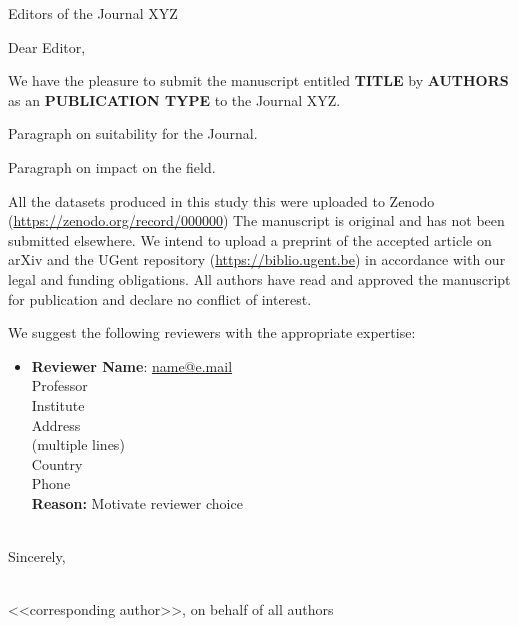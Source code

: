 \documentclass[11pt]{letter}
\begin{document}
\begin{letter}{Editors of the Journal XYZ}

\opening{Dear Editor,}

We have the pleasure to submit the manuscript entitled
\textbf{TITLE}
by \textbf{AUTHORS} as an \textbf{PUBLICATION TYPE} to the Journal XYZ.

Paragraph on suitability for the Journal.

Paragraph on impact on the field.

All the datasets produced in this study this were uploaded to Zenodo (\url{https://zenodo.org/record/000000}) The manuscript is original and has not been submitted elsewhere.
We intend to upload a preprint of the accepted article on arXiv and the UGent repository (\url{https://biblio.ugent.be}) in accordance with our legal and funding obligations.
All authors have read and approved the manuscript for publication and declare no conflict of interest.

We suggest the following reviewers with the appropriate expertise:
%
\begin{itemize}[itemsep=12pt]
    \item
    \begin{minipage}[t]{\linewidth}
    \textbf{Reviewer Name}: \href{mailto:name@e.mail}{name@e.mail} \\
    Professor \\
    Institute \\
    Address \\
    (multiple lines) \\
    Country \\
    Phone \\
    \textbf{Reason:} Motivate reviewer choice
    \end{minipage}
\end{itemize}

\-\\[1em]
Sincerely,

\-\\[4\medskipamount]

<<corresponding author>>, on behalf of all authors


\end{letter}
\end{document}
